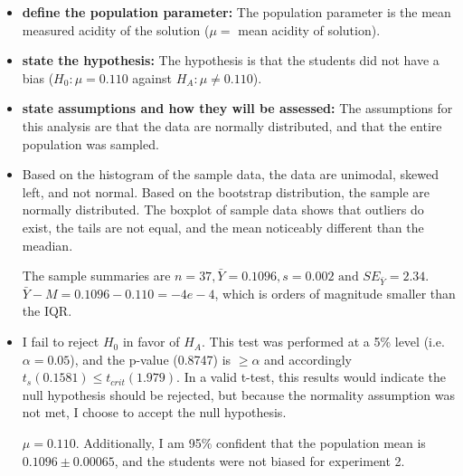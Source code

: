 \documentclass{article}\usepackage[]{graphicx}\usepackage[]{color}
\begin{document}
\begin{itemize}
  \item \textbf{define the population parameter:} The population parameter is
  the mean measured acidity of the solution ($\mu = $ mean acidity of solution).

  \item \textbf{state the hypothesis:}  The hypothesis is that the students did
  not have a bias ($H_0: \mu = 0.110$ against $H_A: \mu \neq 0.110$).

  \item \textbf{state assumptions and how they will be assessed:}  The assumptions for
  this analysis are that the data are normally distributed, and that the entire
  population was sampled.

  \item
  Based on the histogram of the sample data, the data are unimodal, skewed left,
  and not normal.  Based on the bootstrap distribution, the sample are
  normally distributed.  The boxplot of sample data shows that outliers
  do exist, the tails are not equal, and the mean noticeably different than
  the meadian.

  The sample summaries are $n = 37, \bar{Y} = 0.1096, s = 0.002 \text{ and }
  SE_{\bar{Y}} = 2.34$.  $\bar{Y} - M = 0.1096 - 0.110 = -4e-4$, which is
  orders of magnitude smaller than the IQR.

  \item
  I fail to reject $H_0$ in favor of $H_A$.  This test was performed at a 5\% level
  (i.e. $\alpha = 0.05$), and the p-value (0.8747) is $\ge \alpha$ and
  accordingly $t_s (0.1581) \le t_{crit}(1.979)$. In a valid t-test, this results
  would indicate the null hypothesis should be rejected, but because the
  normality assumption was not met, I choose to accept the null hypothesis.

  $\mu = 0.110$.  Additionally, I am 95\% confident that the population
  mean is $0.1096 \pm 0.00065$, and the students were not biased for experiment 2.
\end{itemize}
\end{document}
